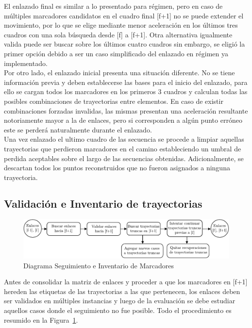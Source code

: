 El enlazado final es similar a lo presentado para régimen, pero en caso de múltiples marcadores candidatos en el cuadro final [f+1] no se puede extender el movimiento, por lo que se elige mediante menor aceleración en los últimos tres cuadros con una sola búsqueda desde [f] a [f+1]. Otra alternativa igualmente valida puede ser buscar sobre los últimos cuatro cuadros sin embargo, se eligió la primer opción debido a ser un caso simplificado del enlazado en régimen ya implementado. 
\\ 

Por otro lado, el enlazado inicial presenta una situación diferente. No se tiene información previa y deben establecerse las bases para el inicio del enlazado, para ello se cargan todos los marcadores en los primeros 3 cuadros y calculan todas las posibles combinaciones de trayectorias entre elementos. En caso de existir combinaciones forzadas invalidas, las mismas presentan una aceleración resultante notoriamente mayor a la de enlaces, pero si corresponden a algún punto erróneo este se perderá naturalmente durante el enlazado.
\\ 

Una vez enlazado el ultimo cuadro de las secuencia se procede a limpiar aquellas trayectorias que perdieron marcadores en el camino estableciendo un umbral de perdida aceptables sobre el largo de las secuencias obtenidas. Adicionalmente, se descartan todos los puntos reconstruidos que no fueron asignados a ninguna trayectoria. 


\subsection{Validación e Inventario de trayectorias}

\begin{figure}[ht!]
\hspace{-1cm}
\includegraphics[scale=0.71]{img/Tracking/diagrama_inventario_seguimiento}
\caption{Diagrama Seguimiento e Inventario de Marcadores}
\label{diagrama_inventario_seguimiento}
\end{figure}

Antes de consolidar la matriz de enlaces y proceder a que los marcadores en [f+1] hereden las etiquetas de las trayectorias a las que pertenecen, los enlaces deben ser validados en múltiples instancias y luego de la evaluación se debe estudiar aquellos casos donde el seguimiento no fue posible. Todo el procedimiento es resumido en la Figura~\ref{diagrama_inventario_seguimiento}.

